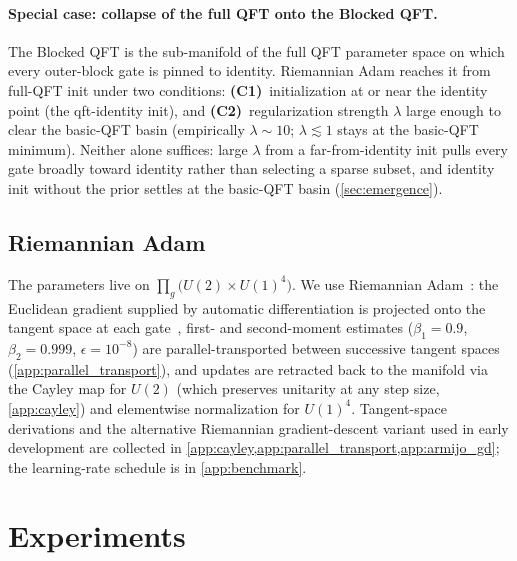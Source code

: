 \documentclass[a4paper, twocolumn]{quantumarticle}
\begin{document}
\paragraph{Special case: collapse of the full QFT onto the Blocked QFT.}
The Blocked QFT is the sub-manifold of the full QFT parameter space on which every outer-block gate is pinned to identity. Riemannian Adam reaches it from full-QFT init under two conditions: \textbf{(C1)}~initialization at or near the identity point (the qft-identity init), and \textbf{(C2)}~regularization strength $\lambda$ large enough to clear the basic-QFT basin (empirically $\lambda \sim 10$; $\lambda \lesssim 1$ stays at the basic-QFT minimum). Neither alone suffices: large $\lambda$ from a far-from-identity init pulls every gate broadly toward identity rather than selecting a sparse subset, and identity init without the prior settles at the basic-QFT basin (\cref{sec:emergence}).

\subsection{Riemannian Adam}
\label{sec:riemannian}

The parameters live on $\prod_g \bigl(U(2) \times U(1)^4\bigr)$. We use Riemannian Adam~\cite{kingma2015adam, becigneul2019riemannian, kasai2019riemannian}: the Euclidean gradient supplied by automatic differentiation is projected onto the tangent space at each gate~\cite{edelman1998geometry, absil2008optimization, boumal2023introduction}, first- and second-moment estimates ($\beta_1 = 0.9$, $\beta_2 = 0.999$, $\epsilon = 10^{-8}$) are parallel-transported between successive tangent spaces (\cref{app:parallel_transport}), and updates are retracted back to the manifold via the Cayley map for $U(2)$ (which preserves unitarity at any step size, \cref{app:cayley}) and elementwise normalization for $U(1)^4$. Tangent-space derivations and the alternative Riemannian gradient-descent variant used in early development are collected in \cref{app:cayley,app:parallel_transport,app:armijo_gd}; the learning-rate schedule is in \cref{app:benchmark}.

\section{Experiments}
\label{sec:experiments}
\end{document}
